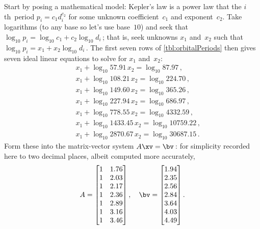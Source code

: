 \begin{example}
\begin{solution}
Start by posing a mathematical model: Kepler's law is a power law that the \(i\)th~period \(p_i=c_1d_i^{c_2}\) for some unknown coefficient~\(c_1\) and exponent~\(c_2\).  
Take logarithms (to any base so let's use base~\(10\)) and seek that 
\(\log_{10}p_i=\log_{10} c_1+c_2\log_{10}d_i\)\,; that is, seek unknowns \(x_1\) and~\(x_2\) such that \(\log_{10}p_i=x_1+x_2\log_{10}d_i\)\,.
The first seven rows of \cref{tbl:orbitalPeriods} then gives seven ideal linear equations to solve for \(x_1\) and~\(x_2\):
\begin{eqnarray*}
&&x_1+\log_{10}57.91\,x_2=\log_{10}87.97\,, %
\\&&x_1+\log_{10}108.21\,x_2=\log_{10}224.70\,, %
\\&&x_1+\log_{10}149.60\,x_2=\log_{10}365.26\,, %
\\&&x_1+\log_{10}227.94\,x_2=\log_{10}686.97\,, %
\\&&x_1+\log_{10}778.55\,x_2=\log_{10}4332.59\,, %
\\&&x_1+\log_{10}1433.45\,x_2=\log_{10}10759.22\,, %
\\&&x_1+\log_{10}2870.67\,x_2=\log_{10}30687.15\,. %
\end{eqnarray*}
Form these into the matrix-vector system \(A\xv=\bv\)\,:
for simplicity recorded here to two decimal places, albeit computed more accurately,
\begin{equation*}
A= \begin{bmatrix}   1&1.76\\
   1&2.03\\
   1&2.17\\
   1&2.36\\
   1&2.89\\
   1&3.16\\
   1&3.46
 \end{bmatrix},
\quad \bv=\begin{bmatrix}   1.94\\
   2.35\\
   2.56\\
   2.84\\
   3.64\\
   4.03\\
   4.49
\end{bmatrix}.
\end{equation*}


\end{solution}
\end{example}
